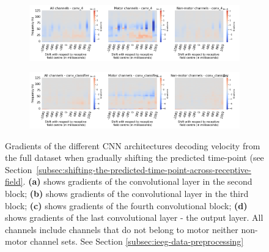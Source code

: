 \begin{figure}
\ContinuedFloat

\begin{subfigure}[b]{\textwidth}
   \includegraphics[width=1\linewidth]{img/appendix/C/m/vel/sbp0_m_shift_gradients_conv_4_all_kinds}
   \caption{}
   \label{fig:vel-shifting-grads-conv-4}
\end{subfigure}

\begin{subfigure}[b]{\textwidth}
   \includegraphics[width=1\linewidth]{img/appendix/C/m/vel/sbp0_m_shift_gradients_conv_classifier_all_kinds}
   \caption{}
   \label{fig:vel-shifting-grads-conv-classifier}
\end{subfigure}

\caption[]{Gradients of the different CNN architectures decoding velocity from the full dataset when gradually shifting the predicted time-point (see Section~\ref{subsec:shifting-the-predicted-time-point-across-receptive-field}. \textbf{(a)} shows gradients of the convolutional layer in the second block; \textbf{(b)} shows gradients of the convolutional layer in the third block; \textbf{(c)} shows gradients of the fourth convolutional block; \textbf{(d)} shows gradients of the last convolutional layer - the output layer. All channels include channels that do not belong to motor neither non-motor channel sets. See Section \ref{subsec:ieeg-data-preprocessing}}
\label{fig:vel-shifting-grads}
\end{figure}

\clearpage
